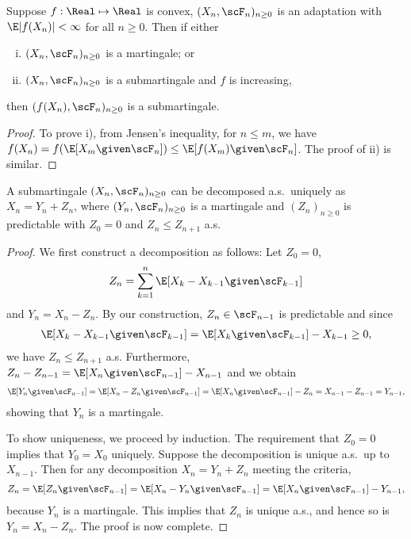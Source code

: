 \documentclass[../aipt.tex]{subfiles}
\begin{document}
\begin{Lemma}\label{wk14:fnM}
Suppose $f : \Real \mapsto \Real$ is convex, $(X_n,\scF_n)_{n\geq0}$ is an adaptation with $\E|f(X_n)| <\infty$ for all $n\geq0$. Then if either
\begin{enumerate}[i)]
	\item $(X_n,\scF_n)_{n\geq0}$ is a martingale; or
	\item $(X_n,\scF_n)_{n\geq0}$ is a submartingale and $f$ is increasing,
\end{enumerate}
then $(f(X_n),\scF_n)_{n\geq0}$ is a submartingale.
\end{Lemma}
\begin{proof}
To prove i), from Jensen's inequality, for $n\leq m$, we have $f(X_n) = f(\E[X_m \given \scF_n]) \leq \E[f(X_m) \given \scF_n]$. The proof of ii) is similar.
\end{proof}

\begin{Theorem}\label{wk14:Doob's decomposition}
A submartingale $(X_n,\scF_n)_{n\geq0}$ can be decomposed a.s.\ uniquely as $X_n = Y_n + Z_n$, where $(Y_n,\scF_n)_{n\geq0}$ is a martingale and $(Z_n)_{n\geq0}$ is predictable with $Z_0=0$ and $Z_n\leq Z_{n+1}$ a.s.
\end{Theorem}
\begin{proof}
We first construct a decomposition as follows: Let $Z_0=0$, 
\begin{align*}
Z_n=\sum_{k=1}^n \E[X_k-X_{k-1} \given \scF_{k-1}]
\end{align*}
 and $Y_n=X_n-Z_n$. By our construction, $Z_n \in \scF_{n-1}$ is predictable and since 
\begin{align*}
\E[X_k-X_{k-1} \given \scF_{k-1}] = \E[X_k \given \scF_{k-1}] - X_{k-1} \geq 0,
\end{align*}
we have $Z_n \leq Z_{n+1}$ a.s. Furthermore, $Z_n - Z_{n-1} = \E[X_n \given \scF_{n-1}] - X_{n-1}$ and we obtain
\begin{align*}
\E[Y_n \given \scF_{n-1}] = \E[X_n - Z_n \given \scF_{n-1}] = \E[X_n \given \scF_{n-1}] - Z_n = X_{n-1} - Z_{n-1}= Y_{n-1}, 
\end{align*}
showing that $Y_n$ is a martingale.

To show uniqueness, we proceed by induction. The requirement that $Z_0=0$ implies that $Y_0=X_0$ uniquely. Suppose the decomposition is unique a.s.\ up to $X_{n-1}$. Then for any decomposition $X_n = Y_n + Z_n$ meeting the criteria,
\begin{align*}
Z_n = \E[Z_n \given \scF_{n-1}] = \E[X_n - Y_n \given \scF_{n-1}] = \E[X_n \given \scF_{n-1}] - Y_{n-1}, 
\end{align*}
because $Y_n$ is a martingale. This implies that $Z_n$ is unique a.s., and hence so is $Y_n = X_n - Z_n$. The proof is now complete.
\end{proof}
\end{document}
